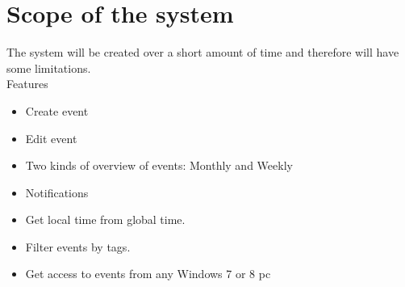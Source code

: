 \section{Scope of the system}
The system will be created over a short amount of time and therefore will have some limitations.\\
Features
\begin{itemize}
\item Create event
\item Edit event
\item Two kinds of overview of events: Monthly and Weekly
\item Notifications
\item Get local time from global time.
\item Filter events by tags.
\item Get access to events from any Windows 7 or 8 pc
\end{itemize}
